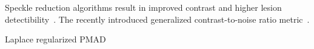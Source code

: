 Speckle reduction algorithms result in improved contrast and higher lesion detectibility~\cite{bottenus_resolution_2021}.
The recently introduced generalized contrast-to-noise ratio metric~\cite{rodriguez-molares_generalized_2020}.

Laplace regularized PMAD












